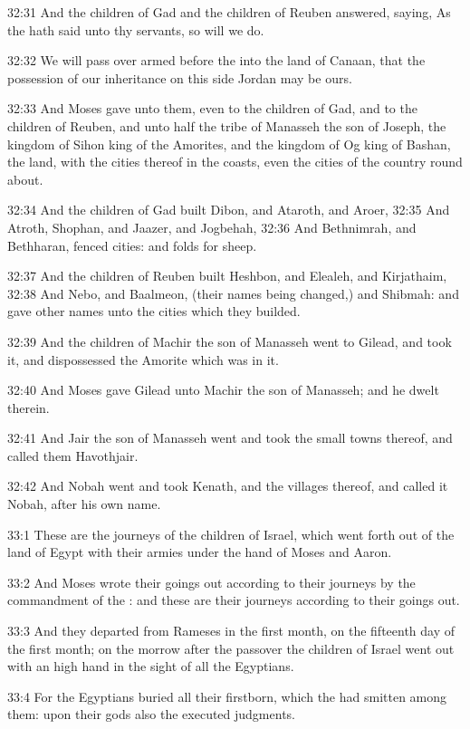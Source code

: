 32:31 And the children of Gad and the children of Reuben answered, saying, As the \LORD hath said unto thy servants, so will we do.

32:32 We will pass over armed before the \LORD into the land of Canaan, that the possession of our inheritance on this side Jordan may be ours.

32:33 And Moses gave unto them, even to the children of Gad, and to the children of Reuben, and unto half the tribe of Manasseh the son of Joseph, the kingdom of Sihon king of the Amorites, and the kingdom of Og king of Bashan, the land, with the cities thereof in the coasts, even the cities of the country round about.

32:34 And the children of Gad built Dibon, and Ataroth, and Aroer, 32:35 And Atroth, Shophan, and Jaazer, and Jogbehah, 32:36 And Bethnimrah, and Bethharan, fenced cities: and folds for sheep.

32:37 And the children of Reuben built Heshbon, and Elealeh, and Kirjathaim, 32:38 And Nebo, and Baalmeon, (their names being changed,) and Shibmah: and gave other names unto the cities which they builded.

32:39 And the children of Machir the son of Manasseh went to Gilead, and took it, and dispossessed the Amorite which was in it.

32:40 And Moses gave Gilead unto Machir the son of Manasseh; and he dwelt therein.

32:41 And Jair the son of Manasseh went and took the small towns thereof, and called them Havothjair.

32:42 And Nobah went and took Kenath, and the villages thereof, and called it Nobah, after his own name.

33:1 These are the journeys of the children of Israel, which went forth out of the land of Egypt with their armies under the hand of Moses and Aaron.

33:2 And Moses wrote their goings out according to their journeys by the commandment of the \LORD: and these are their journeys according to their goings out.

33:3 And they departed from Rameses in the first month, on the fifteenth day of the first month; on the morrow after the passover the children of Israel went out with an high hand in the sight of all the Egyptians.

33:4 For the Egyptians buried all their firstborn, which the \LORD had smitten among them: upon their gods also the \LORD executed judgments.

